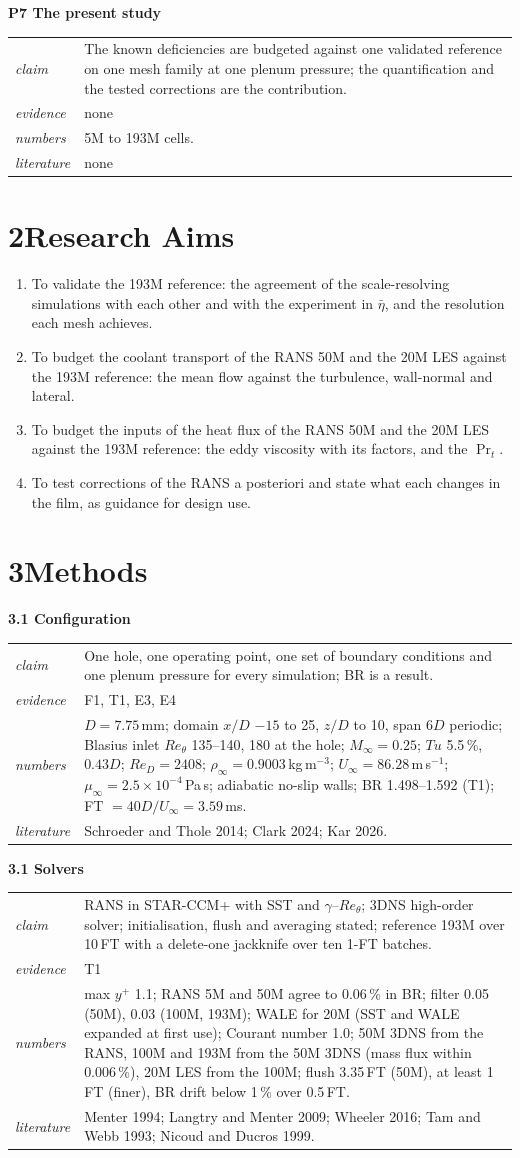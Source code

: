 \documentclass[10pt]{article}
\makeatletter
\newcommand{\etab}{\bar\eta}
\newcommand{\blk}[5]{\textbf{#1}\par
\begin{tabularx}{\textwidth}{@{}>{\itshape}l X@{}}
claim & #2\\ evidence & #3\\ numbers & #4\\ literature & #5\\
\end{tabularx}\par\smallskip}
\makeatother
\begin{document}
\blk{P7 The present study}{The known deficiencies are budgeted against one validated reference on one mesh family
at one plenum pressure; the quantification and the tested corrections are the contribution.}{none}{5M to 193M
cells.}{none}

\section*{2\quad Research Aims}
\begin{enumerate}[label=\arabic*.]
\item To validate the 193M reference: the agreement of the scale-resolving simulations with each other and with
  the experiment in $\etab$, and the resolution each mesh achieves.
\item To budget the coolant transport of the RANS 50M and the 20M LES against the 193M reference: the mean flow
  against the turbulence, wall-normal and lateral.
\item To budget the inputs of the heat flux of the RANS 50M and the 20M LES against the 193M reference: the eddy
  viscosity with its factors, and the $\Pr_t$.
\item To test corrections of the RANS a posteriori and state what each changes in the film, as guidance for design
  use.
\end{enumerate}

\section*{3\quad Methods}

\blk{3.1 Configuration}{One hole, one operating point, one set of boundary conditions and one plenum pressure for
every simulation; BR is a result.}{F1, T1, E3, E4}{$D=7.75$\,mm; domain $x/D$ $-15$ to 25, $z/D$ to 10, span
$6D$ periodic; Blasius inlet $Re_\theta$ 135--140, 180 at the hole; $M_\infty=0.25$; $Tu$ 5.5\,\%, $0.43D$;
$Re_D=2408$; $\rho_\infty=0.9003$\,kg\,m$^{-3}$; $U_\infty=86.28$\,m\,s$^{-1}$; $\mu_\infty=2.5\times10^{-4}$\,Pa\,s;
adiabatic no-slip walls; BR 1.498--1.592 (T1); FT $=40D/U_\infty=3.59$\,ms.}{Schroeder and
Thole 2014; Clark 2024; Kar 2026.}

\blk{3.1 Solvers}{RANS in STAR-CCM+ with SST and $\gamma$--$Re_\theta$; 3DNS high-order solver; initialisation,
flush and averaging stated; reference 193M over 10\,FT with a delete-one jackknife over ten 1-FT batches.}{T1}{max
$y^+$ 1.1; RANS 5M and 50M agree to 0.06\,\% in BR; filter 0.05 (50M), 0.03 (100M, 193M); WALE for 20M (SST and
WALE expanded at first use); Courant
number 1.0; 50M 3DNS from the RANS, 100M and 193M from the 50M 3DNS (mass flux within 0.006\,\%), 20M LES from the
100M; flush 3.35\,FT (50M), at least 1\,FT (finer), BR drift below 1\,\% over 0.5\,FT.}{Menter 1994; Langtry and
Menter 2009; Wheeler 2016; Tam and Webb 1993; Nicoud and Ducros 1999.}
\end{document}
